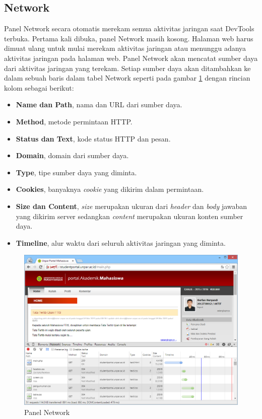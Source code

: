 \subsection{Network}
Panel Network secara otomatis merekam semua aktivitas jaringan saat DevTools terbuka. Pertama kali dibuka, panel Network masih kosong. Halaman web harus dimuat ulang untuk mulai merekam aktivitas jaringan atau menunggu adanya aktivitas jaringan pada halaman web. Panel Network akan mencatat sumber daya dari aktivitas jaringan yang terekam. Setiap sumber daya akan ditambahkan ke dalam sebuah baris dalam tabel Network seperti pada gambar \ref{fig:2_network_panel} dengan rincian kolom sebagai berikut:
\begin{itemize}
	\item \textbf{Name dan Path}, nama dan URL dari sumber daya.
	\item \textbf{Method}, metode permintaan HTTP.
	\item \textbf{Status dan Text}, kode status HTTP dan pesan.
	\item \textbf{Domain}, domain dari sumber daya.
	\item \textbf{Type}, tipe sumber daya yang diminta.
	\item \textbf{Cookies}, banyaknya \textit{cookie} yang dikirim dalam permintaan.
	\item \textbf{Size dan Content}, \textit{size} merupakan ukuran dari \textit{header} dan \textit{body} jawaban yang dikirim server sedangkan \textit{content} merupakan ukuran konten sumber daya.
	\item \textbf{Timeline}, alur waktu dari seluruh aktivitas jaringan yang diminta.
\end{itemize}

\begin{figure}[H]
	\centering
	\includegraphics[scale=0.5]{Gambar/network-panel}
	\caption{Panel Network} 
	\label{fig:2_network_panel}
\end{figure}


